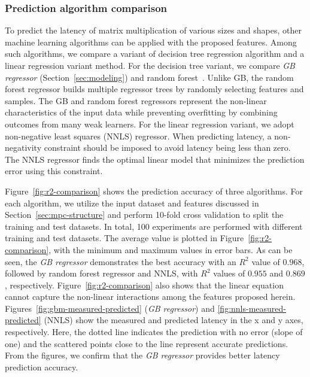 \documentclass[10pt, conference, compsocconf]{IEEEtran}
\begin{document}
\subsubsection{Prediction algorithm comparison}
To predict the latency of matrix multiplication of various sizes and shapes, other machine learning algorithms can be applied with the proposed features. Among such algorithms, we compare a variant of decision tree regression algorithm and a linear regression variant method. For the decision tree variant, we compare \textit{GB regressor} (Section~\ref{sec:modeling}) and random forest~\cite{random-forest}. Unlike GB, the random forest regressor builds multiple regressor trees by randomly selecting features and samples. The GB and random forest regressors represent the non-linear characteristics of the input data while preventing overfitting by combining outcomes from many weak learners. For the linear regression variant, we adopt non-negative least squares (NNLS) regressor. When predicting latency, a non-negativity constraint should be imposed to avoid latency being less than zero. The NNLS regressor finds the optimal linear model that minimizes the prediction error using this constraint.

Figure~\ref{fig:r2-comparison} shows the prediction accuracy of three algorithms. For each algorithm, we utilize the input dataset and features discussed in Section~\ref{sec:mpc-structure} and perform 10-fold cross validation to split the training and test datasets. In total, 100 experiments are performed with different training and test datasets. The average value is plotted in Figure~\ref{fig:r2-comparison}, with the minimum and maximum values in error bars. As can be seen, the \textit{GB regressor} demonstrates the best accuracy with an $R^2$ value of $0.968$, followed by random forest regressor and NNLS, with  $R^2$ values of $0.955$ and $0.869$, respectively. Figure~\ref{fig:r2-comparison} also shows that the linear equation cannot capture the non-linear interactions among the features proposed herein. Figures~\ref{fig:gbm-measured-predicted} (\textit{GB regressor}) and \ref{fig:nnls-measured-predicted} (NNLS) show the measured and predicted latency in the x and y axes, respectively. Here, the dotted line indicates the prediction with no error (slope of one) and the scattered points close to the line represent accurate predictions. From the figures, we confirm that the \textit{GB regressor} provides better latency prediction accuracy.
\end{document}
